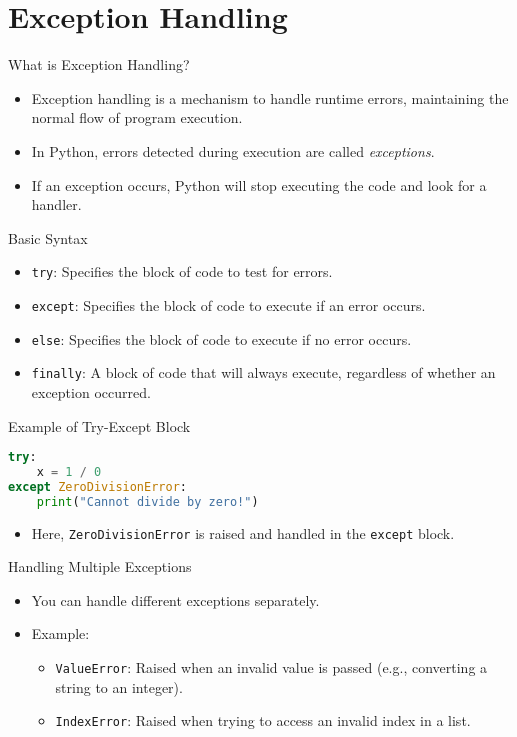 \section{Exception Handling}
\begin{frame}[plain]
\sectionpage
\end{frame}

\begin{frame}{What is Exception Handling?}
\begin{itemize}
    \item Exception handling is a mechanism to handle runtime errors, maintaining the normal flow of program execution.
    \item In Python, errors detected during execution are called \textit{exceptions}.
    \item If an exception occurs, Python will stop executing the code and look for a handler.
\end{itemize}
\end{frame}

\begin{frame}[allowframebreaks]{Basic Syntax}
\begin{itemize}
    \item \texttt{try}: Specifies the block of code to test for errors.
    \item \texttt{except}: Specifies the block of code to execute if an error occurs.
    \item \texttt{else}: Specifies the block of code to execute if no error occurs.
    \item \texttt{finally}: A block of code that will always execute, regardless of whether an exception occurred.
\end{itemize}
\end{frame}


\begin{frame}[fragile]{Example of Try-Except Block}
\begin{lstlisting}[language=Python]
try:
    x = 1 / 0
except ZeroDivisionError:
    print("Cannot divide by zero!")
\end{lstlisting}
\begin{itemize}
\item Here, \texttt{ZeroDivisionError} is raised and handled in the \texttt{except} block.
\end{itemize}
\end{frame}


\begin{frame}{Handling Multiple Exceptions}
\begin{itemize}
\item You can handle different exceptions separately.
\item Example:
\begin{itemize}
    \item \texttt{ValueError}: Raised when an invalid value is passed (e.g., converting a string to an integer).
    \item \texttt{IndexError}: Raised when trying to access an invalid index in a list.
\end{itemize}
\end{itemize}
\end{frame}

